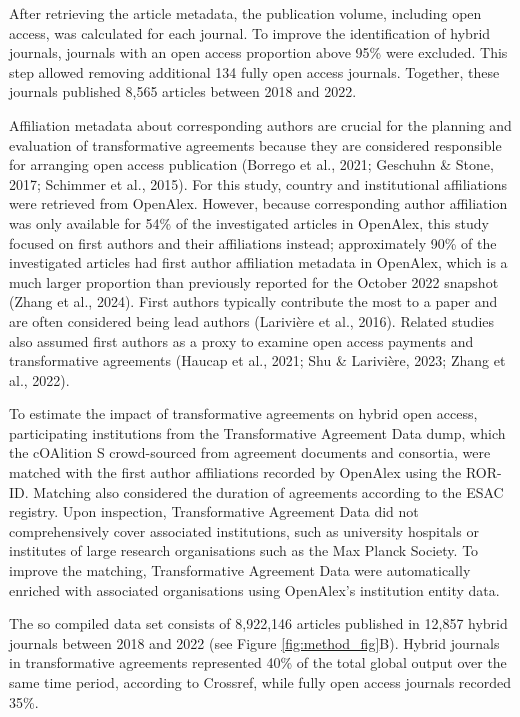 \documentclass[a4paper,man,floatsintext,longtable,noextraspace,12pt]{apa6}
\begin{document}
After retrieving the article metadata, the publication volume, including
open access, was calculated for each journal. To improve the
identification of hybrid journals, journals with an open access
proportion above 95\% were excluded. This step allowed removing
additional 134 fully open access journals. Together, these journals
published 8,565 articles between 2018 and 2022.

Affiliation metadata about corresponding authors are crucial for the
planning and evaluation of transformative agreements because they are
considered responsible for arranging open access publication (Borrego et
al., 2021; Geschuhn \& Stone, 2017; Schimmer et al., 2015). For this
study, country and institutional affiliations were retrieved from
OpenAlex. However, because corresponding author affiliation was only
available for 54\% of the investigated articles in OpenAlex, this study
focused on first authors and their affiliations instead; approximately
90\% of the investigated articles had first author affiliation metadata
in OpenAlex, which is a much larger proportion than previously reported
for the October 2022 snapshot (Zhang et al., 2024). First authors
typically contribute the most to a paper and are often considered being
lead authors (Larivière et al., 2016). Related studies also assumed
first authors as a proxy to examine open access payments and
transformative agreements (Haucap et al., 2021; Shu \& Larivière, 2023;
Zhang et al., 2022).

To estimate the impact of transformative agreements on hybrid open
access, participating institutions from the Transformative Agreement
Data dump, which the cOAlition S crowd-sourced from agreement documents
and consortia, were matched with the first author affiliations recorded
by OpenAlex using the ROR-ID. Matching also considered the duration of
agreements according to the ESAC registry. Upon inspection,
Transformative Agreement Data did not comprehensively cover associated
institutions, such as university hospitals or institutes of large
research organisations such as the Max Planck Society. To improve the
matching, Transformative Agreement Data were automatically enriched with
associated organisations using OpenAlex's institution entity data.

The so compiled data set consists of 8,922,146 articles published in
12,857 hybrid journals between 2018 and 2022 (see Figure
\ref{fig:method_fig}B). Hybrid journals in transformative agreements
represented 40\% of the total global output over the same time period,
according to Crossref, while fully open access journals recorded 35\%.
\end{document}
